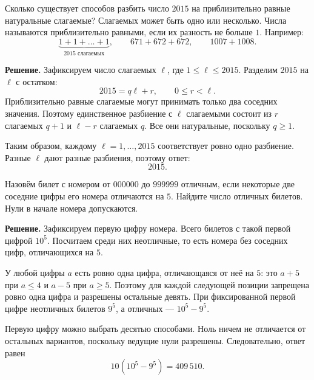 \begin{problems}
\item Сколько существует способов разбить число $2015$ на приблизительно равные натуральные слагаемые? Слагаемых может быть одно или несколько. Числа называются приблизительно равными, если их разность не больше $1$. Например:
\[
\underbrace{1+1+\ldots+1}_{2015\text{ слагаемых}},
\qquad 671+672+672,
\qquad 1007+1008.
\]
\par\smallskip\noindent\textbf{Решение.} Зафиксируем число слагаемых $\ell$, где $1\le\ell\le2015$. Разделим $2015$ на $\ell$ с остатком:
\[
2015=q\ell+r,\qquad 0\le r<\ell.
\]
Приблизительно равные слагаемые могут принимать только два соседних значения. Поэтому единственное разбиение с $\ell$ слагаемыми состоит из $r$ слагаемых $q+1$ и $\ell-r$ слагаемых $q$. Все они натуральные, поскольку $q\ge1$.
\par Таким образом, каждому $\ell=1,\ldots,2015$ соответствует ровно одно разбиение. Разные $\ell$ дают разные разбиения, поэтому ответ:
\[
2015.
\]\par

\item Назовём билет с номером от $000000$ до $999999$ отличным, если некоторые две соседние цифры его номера отличаются на $5$. Найдите число отличных билетов. Нули в начале номера допускаются.
\par\smallskip\noindent\textbf{Решение.} Зафиксируем первую цифру номера. Всего билетов с такой первой цифрой $10^5$. Посчитаем среди них неотличные, то есть номера без соседних цифр, отличающихся на $5$.
\par У любой цифры $a$ есть ровно одна цифра, отличающаяся от неё на $5$: это $a+5$ при $a\le4$ и $a-5$ при $a\ge5$. Поэтому для каждой следующей позиции запрещена ровно одна цифра и разрешены остальные девять. При фиксированной первой цифре неотличных билетов $9^5$, а отличных --- $10^5-9^5$.
\par Первую цифру можно выбрать десятью способами. Ноль ничем не отличается от остальных вариантов, поскольку ведущие нули разрешены. Следовательно, ответ равен
\[
10(10^5-9^5)=409\,510.
\]\par

\end{problems}


